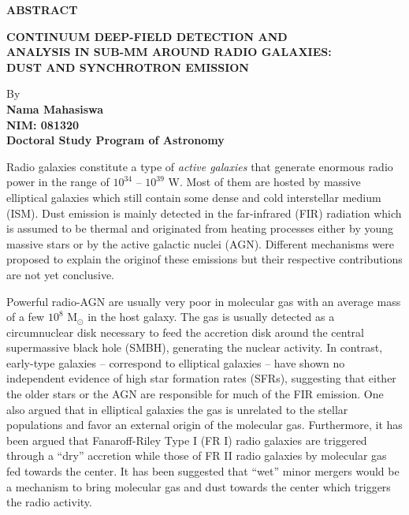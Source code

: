 \begin{center}
\textbf{ABSTRACT}

\vspace{0.5cm}

\textbf{CONTINUUM DEEP-FIELD DETECTION AND \\ ANALYSIS IN SUB-MM AROUND RADIO GALAXIES: \\ DUST AND SYNCHROTRON EMISSION}\\
\vspace{0.5cm}

By\\
\textbf{Nama Mahasiswa\\
NIM: 081320\\
Doctoral Study Program of Astronomy}\\
\end{center}

\vspace{1.0cm}

Radio galaxies constitute a type of \textit{active galaxies} that generate enormous radio power in the range of $10^{34}$ -- $10^{39}$ W. Most of them are hosted by  massive elliptical galaxies which still contain some dense and cold interstellar medium (ISM). Dust emission is mainly detected in the far-infrared (FIR) radiation which is assumed to be thermal and originated from heating processes either by young massive stars or by the active galactic nuclei (AGN). Different mechanisms were proposed to explain the originof these emissions but their respective contributions are not yet conclusive.

Powerful radio-AGN are usually very poor in molecular gas with an average mass of a few $10^8$ M$_\odot$ in the host galaxy. The gas is usually detected as a circumnuclear disk necessary to feed the accretion disk around the central supermassive black hole (SMBH), generating the nuclear activity. In contrast, early-type galaxies -- correspond to elliptical galaxies -- have shown no independent evidence of high star formation rates (SFRs), suggesting that either the older stars or the AGN are responsible for much of the FIR emission. One also argued that in  elliptical galaxies the gas is unrelated to the stellar populations and favor an external origin of the molecular gas. Furthermore, it has been argued that Fanaroff-Riley Type I (FR I) radio galaxies are triggered through a ``dry'' accretion while those of FR II radio galaxies by molecular gas fed towards the center. It has been suggested that ``wet''  minor mergers would be a mechanism to bring molecular gas and dust towards the center which triggers the radio activity.


